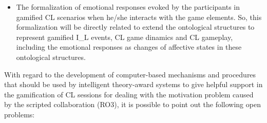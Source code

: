 \begin{itemize}
\item The formalization of emotional responses evoked by the participants in gamified CL scenarios when he/she interacts with the game elements. So, this formalization will be directly related to extend the ontological structures to represent gamified I\_L events, CL game dinamics and CL gameplay, including the emotional responses as changes of affective states in these ontological structures.
\end{itemize}

With regard to the development of computer-based mechanisms and procedures that should be used by intelligent theory-award systems to give helpful support in the gamification of CL sessions for dealing with the motivation problem caused by the scripted collaboration (RO3), it is possible to point out the following open problems:

